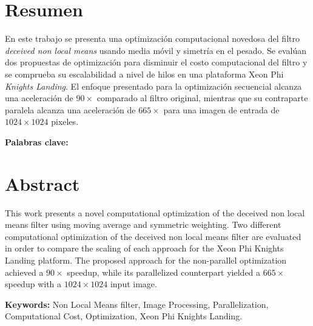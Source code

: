 \chapter*{Resumen}
\thispagestyle{empty}

En este trabajo se presenta una optimizaci\'on computacional novedosa del filtro \textit{deceived non local means} usando media móvil y simetr\'ia en el pesado. Se evalúan dos propuestas de optimización para disminuir el costo computacional del filtro y se comprueba su escalabilidad a nivel de hilos en una plataforma  Xeon Phi \textit{Knights Landing}. El enfoque presentado para la optimización secuencial alcanza una aceleración de $90\times$ comparado al filtro original, mientras que su contraparte paralela alcanza una aceleración de $665\times$ para una imagen de entrada de $1024\times1024$ pixeles.

\bigskip

\textbf{Palabras clave:} \scriptKeywords

\clearpage
\chapter*{Abstract}
\thispagestyle{empty}

This work presents a novel computational optimization of the deceived non local means filter using moving average and symmetric weighting. Two different computational optimization of the deceived non local means filter are evaluated in order to compare the scaling of each approach for the Xeon Phi Knights Landing platform. The proposed approach for the non-parallel optimization achieved a $90\times$ speedup, while its parallelized counterpart yielded a $665\times$ speedup with a $1024\times1024$ input image. 

\bigskip

\textbf{Keywords:} Non Local Means filter, Image Processing, Parallelization, Computational Cost, Optimization, Xeon Phi Knights Landing.

\cleardoublepage

